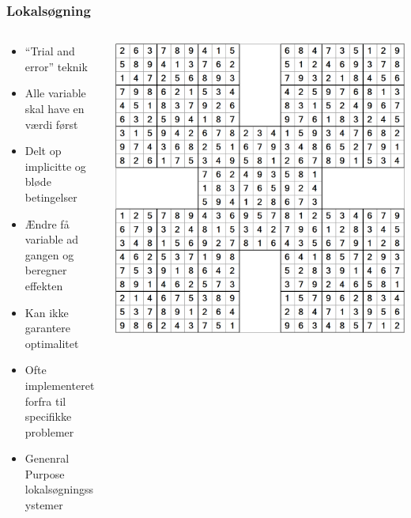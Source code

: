 \documentclass[smaller,handouts]{beamer}
\begin{document}
\begin{frame}
\frametitle{Lokalsøgning}
\begin{columns}[T]
    \begin{column}[T]{.5\textwidth}\begin{itemize}[<+->]
\item ``Trial and error'' teknik
\item Alle variable skal have en værdi først
\item Delt op implicitte og bløde betingelser
\item Ændre få variable ad gangen og beregner effekten
\item \alert{Kan ikke garantere optimalitet}
\item Ofte implementeret forfra til specifikke problemer
\item Genenral Purpose lokalsøgningssystemer
\end{itemize}
\end{column} 
\begin{column}[T]{.5\textwidth} \vfill
\includegraphics[scale=0.2]{lokals5.png}
\end{column}
\end{columns}
\end{frame}
\end{document}
